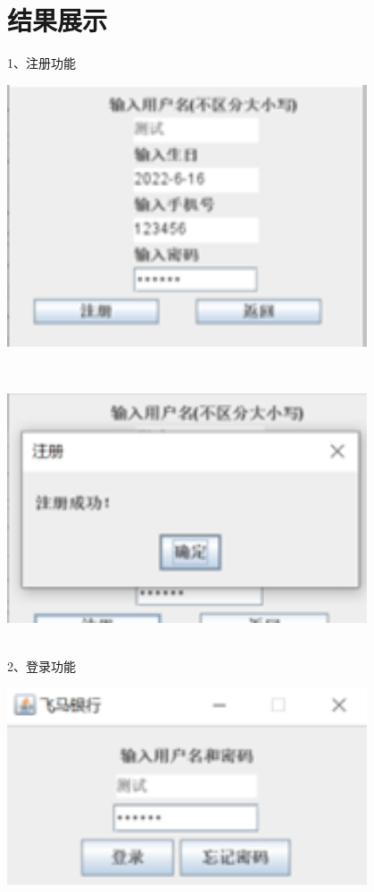 \section{结果展示}
1、注册功能\\
\begin{centering}
	\centering
	\includegraphics[width=0.8\textwidth]{figure/图3}
	\label{fig:example}
\end{centering}\\
\begin{centering}
	\centering
	\includegraphics[width=0.8\textwidth]{figure/图4}
	\label{fig:example}
\end{centering}\\
2、登录功能\\
\begin{centering}
	\centering
	\includegraphics[width=0.8\textwidth]{figure/图5}
	\label{fig:example}
\end{centering}\\
